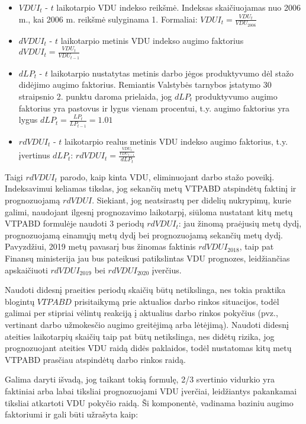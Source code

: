 \documentclass[titlepage, 11pt]{article}
\begin{document}
\begin{itemize}
\item $VDUI_{t}$ - $t$ laikotarpio VDU indekso reikšmė. Indeksas skaičiuojamas nuo 2006 m., kai 2006 m. reikšmė sulyginama 1. Formaliai: $VDUI_{t}=\frac{VDU_{t}}{VDU_{2006}}$
\item $dVDUI_t$ - $t$ laikotarpio metinis VDU indekso augimo faktorius $dVDUI_{t}=\frac{VDU_{t}}{VDU_{t-1}}$
\item $dLP_t$ - $t$ laikotarpio nustatytas metinis darbo jėgos produktyvumo dėl stažo didėjimo augimo faktorius. Remiantis Valstybės tarnybos įstatymo 30 straipsnio 2. punktu daroma prielaida, jog $dLP_t$ produktyvumo augimo faktorius yra pastovus ir lygus vienam procentui, t.y. augimo faktorius yra lygus $dLP_t=\frac{LP_t}{LP_{t-1}}=1.01$
\item $rdVDUI_t$ - $t$ laikotarpio realus metinis VDU indekso augimo faktorius, t.y.  įvertinus $dLP_t$: $rdVDUI_t=\frac{\frac{VDU_{t}}{VDU_{t-1}}}{dLP_t}$
\end{itemize}

Taigi $rdVDUI_t$ parodo, kaip kinta VDU, eliminuojant darbo stažo poveikį. Indeksavimui keliamas tikslas, jog sekančių metų VTPABD atspindėtų  faktinį ir prognozuojamą $rdVDUI$. Siekiant, jog neatsirastų per didelių nukrypimų, kurie galimi, naudojant ilgesnį prognozavimo laikotarpį, siūloma nustatant kitų metų VTPABD formulėje naudoti 3 periodų $rdVDUI_t$: jau žinomą praėjusių metų dydį, prognozuojamą einamųjų metų dydį bei prognozuojamą sekančių metų dydį. Pavyzdžiui, 2019 metų pavasarį bus žinomas faktinis $rdVDUI_{2018}$, taip pat Finansų ministerija jau bus pateikusi patikslintas VDU prognozes, leidžiančias apskaičiuoti $rdVDUI_{2019}$ bei $rdVDUI_{2020}$ įverčius. 

Naudoti didesnį praeities periodų skaičių būtų netikslinga, nes tokia praktika blogintų $VTPABD$ prisitaikymą prie aktualios darbo rinkos situacijos, todėl galimai per stipriai vėlintų reakciją į aktualius darbo rinkos pokyčius (pvz., vertinant darbo užmokesčio augimo greitėjimą arba lėtėjimą). Naudoti didesnį ateities laikotarpių  skaičių taip pat būtų netikslinga, nes  didėtų rizika, jog prognozuojant ateities VDU raidą didės paklaidos, todėl nustatomas kitų metų VTPABD prasčiau atspindėtų darbo rinkos raidą.

Galima daryti išvadą, jog taikant tokią formulę, 2/3 svertinio vidurkio yra faktiniai arba labai tiksliai prognozuojami VDU įverčiai, leidžiantys pakankamai tiksliai atkartoti VDU pokyčio raidą. 
Ši komponentė, vadinama baziniu augimo faktoriumi ir gali būti užrašyta kaip: 
\end{document}
